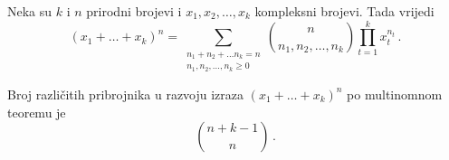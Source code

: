 \begin{theorem}
    Neka su $k$ i $n$ prirodni brojevi i $x_1, x_2, \dots, x_k$ kompleksni
    brojevi. Tada vrijedi
    $$
        (x_1 + \dots + x_k)^n = \sum_{\substack{n_1+n_2+\dots n_k = n\\n_1, n_2, \dots, n_k \geq 0}} \binom{n}{n_1, n_2, \dots, n_k} \prod_{t=1}^{k} x_t^{n_t}\,.
    $$
\end{theorem}

\begin{theorem}
    Broj različitih pribrojnika u razvoju izraza $(x_1 + \dots + x_k)^n$ po
    multinomnom teoremu je
    $$
        \binom{n + k - 1}{n}\,.
    $$
\end{theorem}